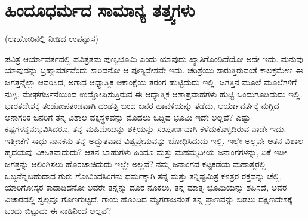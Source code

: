 
\chapter{ಹಿಂದೂಧರ್ಮದ ಸಾಮಾನ್ಯ ತತ್ತ್ವಗಳು}

\begin{center}
(ಲಾಹೋರಿನಲ್ಲಿ ನೀಡಿದ ಉಪನ್ಯಾಸ) 
\end{center}

ಪವಿತ್ರ ಆರ್ಯಾವರ್ತದಲ್ಲಿ ಪವಿತ್ರತಮ ಪುಣ್ಯಭೂಮಿ ಎಂದು ಯಾವುದು ಖ್ಯಾತಿಗೊಂಡಿದೆಯೋ ಅದೇ ಇದು. ಮನುವು ಯಾವುದನ್ನು ಬ್ರಹ್ಮಾವರ್ತವೆಂದು ಸಾರಿದನೋ ಆ ಪುಣ್ಯದೇಶವೇ ಇದು. ಚರಿತ್ರೆಯು ಸಾರುತ್ತಿರುವಂತೆ ಕಾಲಕ್ರಮೇಣ ಈ ಜಗತ್ತನ್ನೆಲ್ಲಾ ಆವರಿಸಿದ, ಅಗಾಧ ಆಧ್ಯಾತ್ಮಿಕ ಆಕಾಂಕ್ಷೆಯ ತರಂಗ ಹುಟ್ಟಿದುದು ಇಲ್ಲಿ. ಜಗತ್ತಿನ ಮೂಲೆ ಮೂಲೆಗಳಿಗೆ ನುಗ್ಗಿ, ಮೇಘಗರ್ಜನೆಯಿಂದ ಉದ್ಘೋಷಿಸುತ್ತಿರುವ ಈ ಆಧ್ಯಾತ್ಮಿಕ ಆಶಾಪ್ರವಾಹಗಳು ಹುಟ್ಟಿ ಒಂದುಗೂಡಿದುದು ಇಲ್ಲಿ. ಭಾರತದೇಶಕ್ಕೆ ತಂಡೋಪತಂಡವಾಗಿ ದಂಡೆತ್ತಿ ಬಂದ ಜನರ ಹಾವಳಿಯನ್ನು ತಡೆದು, ಆರ್ಯಾವರ್ತಕ್ಕೆ ನುಗ್ಗಿದ ಅನಾಗರಿಕ ಜನರಿಗೆ ತನ್ನ ವಿಶಾಲ ವಕ್ಷಸ್ಥಳವನ್ನು ಮೊದಲು ಒಡ್ಡಿದ ಭೂಮಿ ಇದೇ ಅಲ್ಲವೆ? ಎಷ್ಟು ಕಷ್ಟಗಳನ್ನನುಭವಿಸಿದರೂ, ತನ್ನ ಮಹಿಮೆಯನ್ನು ಶಕ್ತಿಯನ್ನು ಸಂಪೂರ್ಣವಾಗಿ ಕಳೆದುಕೊಳ್ಳದಿರುವ ನಾಡೇ ಇದು. ಇತ್ತೀಚೆಗೆ ಸಾಧು ನಾನಕನು ತನ್ನ ಅದ್ಭುತವಾದ ವಿಶ್ವಪ್ರೇಮವನ್ನು ಬೋಧಿಸಿದುದು ಇಲ್ಲಿ. ಇಲ್ಲೇ ಅಲ್ಲವೇ ಆತನ ವಿಶಾಲ ಹೃದಯವು ವಿಕಸಿತವಾದುದು? ಆತನ ಬಾಹುಗಳು ಹಿಂದೂ ಮತ್ತು ಮಹಮ್ಮದೀಯ ಜನಾಂಗಗಳನ್ನು, ಏಕೆ ಇಡೀ ಜಗತ್ತನ್ನು ಆಲಿಂಗಿಸಲು ಹೊರಚಾಚಿದುದು ಇಲ್ಲೇ ಅಲ್ಲವೆ? ನಮ್ಮ ಜನಾಂಗದ ಕಟ್ಟಕಡೆಯ ಮಹಾತ್ಮರಲ್ಲಿ ಒಬ್ಬನೆನ್ನಬಹುದಾದ ಗುರು ಗೋವಿಂದಸಿಂಗನು ಧರ್ಮಕ್ಕಾಗಿ ತನ್ನ ಮತ್ತು ತನ್ನಿಷ್ಟಮಿತ್ರ ಕಳತ್ರರ ರಕ್ತವನ್ನು ಚೆಲ್ಲಿ, ಯಾರಿಗೋಸ್ಕರ ಕಾದಾಡಿದನೋ ಅವರೇ ತನ್ನನ್ನು ದೂರ ನೂಕಲು, ತನ್ನ ಮಾತೃ ಭೂಮಿಯನ್ನು ಶಪಿಸದೆ, ಅವರ ವಿಚಾರದಲ್ಲಿ ಸ್ವಲ್ಪವೂ ಗೊಣಗುಟ್ಟದೆ, ಗಾಯ ಹೊಂದಿದ ಮೃಗರಾಜನಂತೆ ತನ್ನ ಪ್ರಾಣವನ್ನು ಬಿಡಲು ದಕ್ಷಿಣದೇಶಕ್ಕೆ ಬಂದು ಬಿಟ್ಟುದು ಈ ನಾಡಿನಿಂದ ಅಲ್ಲವೆ?

